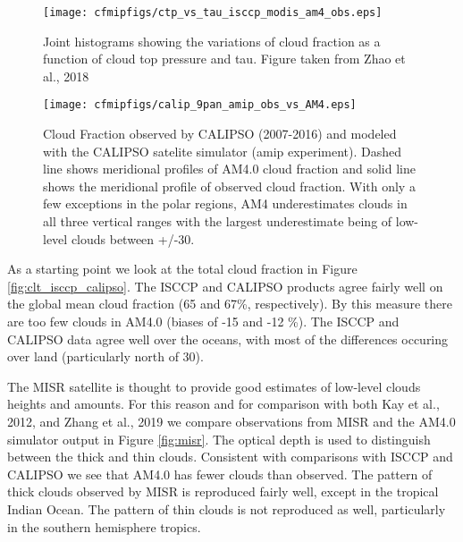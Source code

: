 \documentclass[11pt]{article}   	%
\begin{document}
\begin{figure}
  \texttt{[image: cfmipfigs/ctp\_vs\_tau\_isccp\_modis\_am4\_obs.eps]}
  \caption{Joint histograms showing the variations of cloud fraction as a function of cloud top pressure and tau.
  Figure taken from Zhao et al., 2018}
  \label{fig:calipso_sim_vs_mod}
\end{figure}

\begin{figure}
  \texttt{[image: cfmipfigs/calip\_9pan\_amip\_obs\_vs\_AM4.eps]}
  \caption{Cloud Fraction observed by CALIPSO (2007-2016) and modeled with the CALIPSO satelite simulator 
  (amip experiment).
  Dashed line shows meridional profiles of AM4.0 cloud fraction and solid line shows
  the meridional profile of observed cloud fraction.  With only a few exceptions in the polar regions, AM4 underestimates
  clouds in all three vertical ranges with the largest underestimate being of low-level clouds between +/-30.}
  \label{fig:calipso_9pan}
\end{figure}

As a starting point we look at the total cloud fraction in Figure \ref{fig:clt_isccp_calipso}.  The ISCCP and 
CALIPSO products agree fairly well on the 
global mean cloud fraction (65 and 67\%, respectively).   By this measure there are too few clouds in AM4.0 
(biases of -15 and -12 \%).   The ISCCP and CALIPSO data agree well over the oceans, with most of the differences
occuring over land (particularly north of 30).    

The MISR satellite is thought to provide good estimates of low-level clouds heights and amounts.  For this reason
and for comparison with both Kay et al., 2012, and Zhang et al., 2019 we compare observations from MISR
and the AM4.0 simulator output in Figure \ref{fig:misr}.  The optical depth is used to distinguish
between the thick and thin clouds.  Consistent with comparisons with ISCCP and CALIPSO we see that AM4.0
has fewer clouds than observed.  The pattern of thick clouds observed by MISR is reproduced fairly well, except in 
the tropical Indian Ocean.  The pattern of thin clouds is not reproduced as well, particularly in the southern hemisphere 
tropics.   
\end{document}
